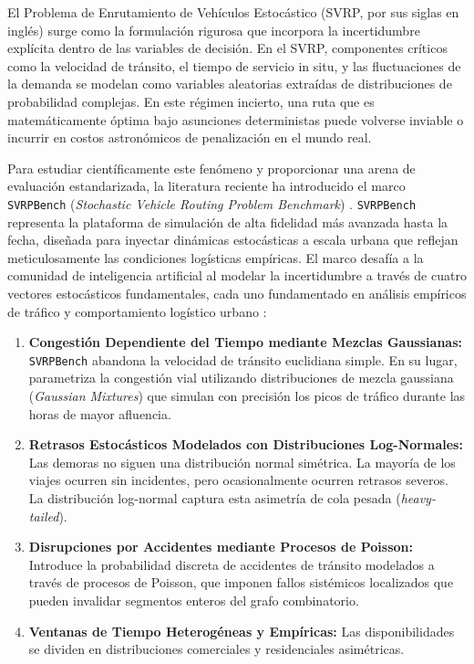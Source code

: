\documentclass[12pt]{report}
\begin{document}
El Problema de Enrutamiento de Veh\'iculos Estoc\'astico (SVRP, por sus siglas en ingl\'es) surge como la formulaci\'on rigurosa que incorpora la incertidumbre expl\'icita dentro de las variables de decisi\'on. En el SVRP, componentes cr\'iticos como la velocidad de tr\'ansito, el tiempo de servicio in situ, y las fluctuaciones de la demanda se modelan como variables aleatorias extra\'idas de distribuciones de probabilidad complejas. En este r\'egimen incierto, una ruta que es matem\'aticamente \'optima bajo asunciones deterministas puede volverse inviable o incurrir en costos astron\'omicos de penalizaci\'on en el mundo real.

Para estudiar cient\'ificamente este fen\'omeno y proporcionar una arena de evaluaci\'on estandarizada, la literatura reciente ha introducido el marco \texttt{SVRPBench} (\textit{Stochastic Vehicle Routing Problem Benchmark}) \cite{Heakl2025SVRP}. \texttt{SVRPBench} representa la plataforma de simulaci\'on de alta fidelidad m\'as avanzada hasta la fecha, dise\~nada para inyectar din\'amicas estoc\'asticas a escala urbana que reflejan meticulosamente las condiciones log\'isticas emp\'iricas. El marco desaf\'ia a la comunidad de inteligencia artificial al modelar la incertidumbre a trav\'es de cuatro vectores estoc\'asticos fundamentales, cada uno fundamentado en an\'alisis emp\'iricos de tr\'afico y comportamiento log\'istico urbano \cite{Heakl2025SVRP}:

\begin{enumerate}[label=\textbf{\arabic*.},leftmargin=1.2cm,itemsep=0.5em]
  \item \textbf{Congesti\'on Dependiente del Tiempo mediante Mezclas Gaussianas:} \texttt{SVRPBench} abandona la velocidad de tr\'ansito euclidiana simple. En su lugar, parametriza la congesti\'on vial utilizando distribuciones de mezcla gaussiana (\textit{Gaussian Mixtures}) que simulan con precisi\'on los picos de tr\'afico durante las horas de mayor afluencia.
  \item \textbf{Retrasos Estoc\'asticos Modelados con Distribuciones Log-Normales:} Las demoras no siguen una distribuci\'on normal sim\'etrica. La mayor\'ia de los viajes ocurren sin incidentes, pero ocasionalmente ocurren retrasos severos. La distribuci\'on log-normal captura esta asimetr\'ia de cola pesada (\textit{heavy-tailed}).
  \item \textbf{Disrupciones por Accidentes mediante Procesos de Poisson:} Introduce la probabilidad discreta de accidentes de tr\'ansito modelados a trav\'es de procesos de Poisson, que imponen fallos sist\'emicos localizados que pueden invalidar segmentos enteros del grafo combinatorio.
  \item \textbf{Ventanas de Tiempo Heterog\'eneas y Emp\'iricas:} Las disponibilidades se dividen en distribuciones comerciales y residenciales asim\'etricas.
\end{enumerate}
\end{document}
